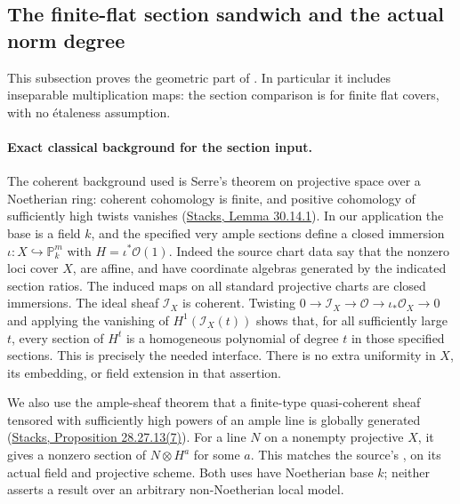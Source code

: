 \subsection{The finite-flat section sandwich and the actual norm degree}
\label{subsec:faithful-geometric-norm-degree}

This subsection proves the geometric part of
.  In particular it includes
inseparable multiplication maps: the section comparison is for
finite flat covers, with no \'etaleness assumption.

\paragraph{Exact classical background for the section input.}
The coherent background used is Serre's theorem on projective
space over a Noetherian ring: coherent cohomology is finite,
and positive cohomology of sufficiently high twists vanishes
(\href{https://stacks.math.columbia.edu/tag/01YS}{Stacks, Lemma 30.14.1}).
In our application the base is a field \(k\), and the specified
very ample sections define a closed immersion
\(\iota:X\hookrightarrow\mathbb P^m_k\) with
\(H=\iota^*\mathcal O(1)\).
Indeed the source chart data say that the nonzero loci cover
\(X\), are affine, and have coordinate algebras generated by
the indicated section ratios.  The induced maps on all
standard projective charts are closed immersions.
The ideal sheaf \(\mathcal I_X\) is coherent.  Twisting
\(0\to\mathcal I_X\to\mathcal O\to\iota_*\mathcal O_X\to0\)
and applying the vanishing of \(H^1(\mathcal I_X(t))\)
shows that, for all sufficiently large \(t\), every section
of \(H^t\) is a homogeneous polynomial of degree \(t\) in those
specified sections.  This is precisely the needed
 interface.
There is no extra uniformity in \(X\), its embedding, or field
extension in that assertion.

We also use the ample-sheaf theorem that a finite-type
quasi-coherent sheaf tensored with sufficiently high powers
of an ample line is globally generated
(\href{https://stacks.math.columbia.edu/tag/01Q3}{Stacks, Proposition 28.27.13(7)}).
For a line \(N\) on a nonempty projective \(X\), it gives a
nonzero section of \(N\otimes H^a\) for some \(a\).
This matches the source's
, on its actual field
and projective scheme.
Both uses have Noetherian base \(k\); neither asserts a result
over an arbitrary non-Noetherian local model.

